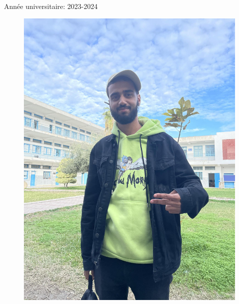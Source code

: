 \vfill
\begin{center}


    \vskip 1cm
    \footnotesize{Année universitaire: 2023-2024}
    \\

\end{center}



\begin{figure}[p]
    \centering
    \includegraphics[width=1\textwidth]{chap1.images/binomi.jpg}
\end{figure}


